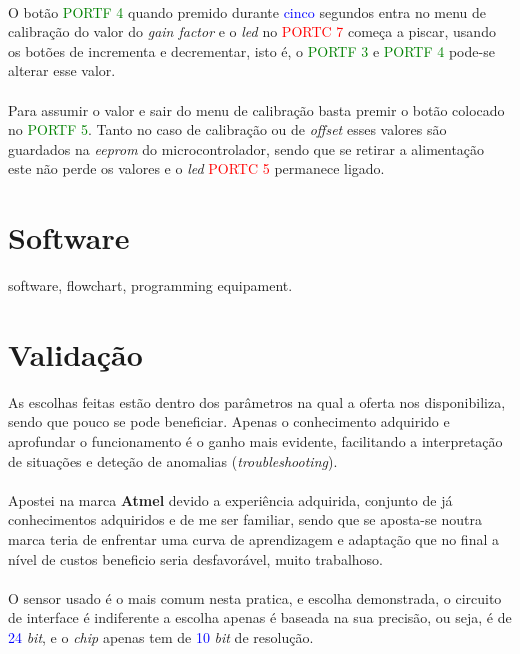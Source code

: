 \\
O botão \textcolor{green}{PORTF 4} quando premido durante \textcolor{blue}{cinco} segundos entra no menu de calibração do valor do \textit{gain factor} e o \textit{led} no \textcolor{red}{PORTC 7} começa a piscar, usando os botões de incrementa e decrementar, isto é, o
\textcolor{green}{PORTF 3} e \textcolor{green}{PORTF 4} pode-se alterar esse valor.\\
\\
Para assumir o valor e sair do menu de calibração basta premir o botão colocado no \textcolor{green}{PORTF 5}. Tanto no caso de calibração ou de \textit{offset} esses valores são guardados na \textit{eeprom} do microcontrolador, sendo que se retirar a alimentação este não perde os valores e o \textit{led} \textcolor{red}{PORTC 5} permanece ligado.
\newpage
\section{Software}
software, flowchart, programming equipament.


\newpage
\section{Validação}
As escolhas feitas estão dentro dos parâmetros na qual a oferta nos disponibiliza, sendo que pouco se pode beneficiar. Apenas o conhecimento adquirido e aprofundar o funcionamento é o ganho mais evidente, facilitando a interpretação de situações e deteção de anomalias (\textit{troubleshooting}).\\
\\
Apostei na marca \textbf{Atmel} devido a experiência adquirida, conjunto de já conhecimentos adquiridos e de me ser familiar, sendo que se aposta-se noutra marca teria de enfrentar uma curva de aprendizagem e adaptação que no final a nível de custos beneficio seria desfavorável, muito trabalhoso.\\
\\
O sensor usado é o mais comum nesta pratica, e escolha demonstrada, o circuito de interface é indiferente a escolha apenas é baseada na sua precisão, ou seja, é de \textcolor{blue}{24} \textit{bit}, e o \textit{chip} apenas tem  de \textcolor{blue}{10} \textit{bit} de resolução.





